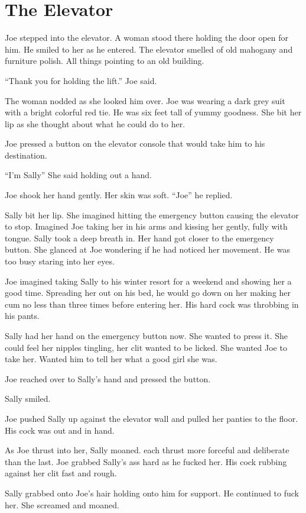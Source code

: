 \section{The Elevator}

Joe stepped into the elevator. A woman stood there holding the door open for him. He smiled to her as he entered. The elevator smelled of old mahogany and furniture polish. All things pointing to an old building.

“Thank you for holding the lift.” Joe said.

The woman nodded as she looked him over. Joe was wearing a dark grey suit with a bright colorful red tie. He was six feet tall of yummy goodness. She bit her lip as she thought about what he could do to her.

Joe pressed a button on the elevator console that would take him to his destination.

“I’m Sally” She said holding out a hand.

Joe shook her hand gently. Her skin was soft. “Joe” he replied.

Sally bit her lip. She imagined hitting the emergency button causing the elevator to stop. Imagined Joe taking her in his arms and kissing her gently, fully with tongue. Sally took a deep breath in. Her hand got closer to the emergency button. She glanced at Joe wondering if he had noticed her movement. He was too busy staring into her eyes.

Joe imagined taking Sally to his winter resort for a weekend and showing her a good time. Spreading her out on his bed, he would go down on her making her cum no less than three times before entering her. His hard cock was throbbing in his pants.

Sally had her hand on the emergency button now. She wanted to press it. She could feel her nipples tingling, her clit wanted to be licked. She wanted Joe to take her. Wanted him to tell her what a good girl she was.

Joe reached over to Sally’s hand and pressed the button.

Sally smiled.

Joe pushed Sally up against the elevator wall and pulled her panties to the floor. His cock was out and in hand.

As Joe thrust into her, Sally moaned. each thrust more forceful and deliberate than the last. Joe grabbed Sally’s ass hard as he fucked her. His cock rubbing against her clit fast and rough.

Sally grabbed onto Joe’s hair holding onto him for support. He continued to fuck her. She screamed and moaned.

